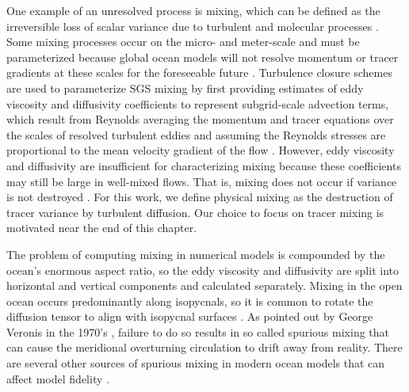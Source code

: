 One example of an unresolved process is mixing, which can be defined as the irreversible loss of scalar variance due to turbulent and molecular processes \citep{Burchard_2008, MacCready_2018}. Some mixing processes occur on the micro- and meter-scale and must be parameterized because global ocean models will not resolve momentum or tracer gradients at these scales for the foreseeable future \citep{fox2014principles, Qu_2022_box}. Turbulence closure schemes are used to parameterize SGS mixing by first providing estimates of eddy viscosity and diffusivity coefficients to represent subgrid-scale advection terms, which result from Reynolds averaging the momentum and tracer equations over the scales of resolved turbulent eddies and assuming the Reynolds stresses are proportional to the mean velocity gradient of the flow \citep{pope2001turbulent}. However, eddy viscosity and diffusivity are insufficient for characterizing mixing because these coefficients may still be large in well-mixed flows. That is, mixing does not occur if variance is not destroyed \citep{Burchard_2008, MacCready_2018, osborn1972oceanic}. For this work, we define physical mixing as the destruction of tracer variance by turbulent diffusion. Our choice to focus on tracer mixing is motivated near the end of this chapter.

The problem of computing mixing in numerical models is compounded by the ocean's enormous aspect ratio, so the eddy viscosity and diffusivity are split into horizontal and vertical components and calculated separately. Mixing in the open ocean occurs predominantly along isopycnals, so it is common to rotate the diffusion tensor to align with isopycnal surfaces \citep{redi1982oceanic}. As pointed out by George Veronis in the 1970's \citep{veronis1975role}, failure to do so results in so called spurious mixing that can cause the meridional overturning circulation to drift away from reality. There are several other sources of spurious mixing in modern ocean models that can affect model fidelity \citep{megann2022assessment, Schlichting23}.  

